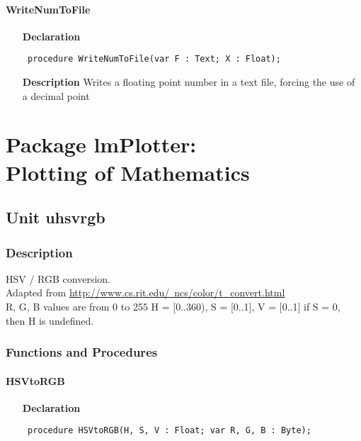 \documentclass[12pt,a4paper,oneside]{report}
\newcommand{\declarationitem}[1]{\textbf{#1}}
\newcommand{\descriptiontitle}[1]{\textbf{#1}}
\newcommand{\code}[1]{\texttt{#1}}
\begin{document}
\subsubsection{WriteNumToFile}
\label{uwinstr-WriteNumToFile}
\begin{itemize}\item[\declarationitem{Declaration}\hfill]
	\begin{flushleft}
		\code{
			procedure WriteNumToFile(var F : Text; X : Float);}
		
	\end{flushleft}
	
	\par
	\item[\descriptiontitle{Description}]
	Writes a floating point number in a text file, forcing the use of a decimal point
	
\end{itemize}
\chapter[Package lmPlotter]{Package lmPlotter: \\ Plotting of Mathematics}\label{package-lmPlotter}
\section{Unit uhsvrgb}
\label{uhsvrgb}
\subsection{Description}
HSV / RGB conversion. \\ 
Adapted from \href{http://www.cs.rit.edu/~ncs/color/t_convert.html}{http://www.cs.rit.edu/~ncs/color/t{\_}convert.html} \\ R, G, B values are from 0 to 255 H = [0..360), S = [0..1], V = [0..1] if S = 0, then H is undefined. 
\subsection{Functions and Procedures}
\subsubsection{HSVtoRGB}
\label{uhsvrgb-HSVtoRGB}
\begin{itemize}\item[\declarationitem{Declaration}\hfill]
	\begin{flushleft}
		\code{
			procedure HSVtoRGB(H, S, V : Float; var R, G, B : Byte);}
		
	\end{flushleft}
	
\end{itemize}
\end{document}
